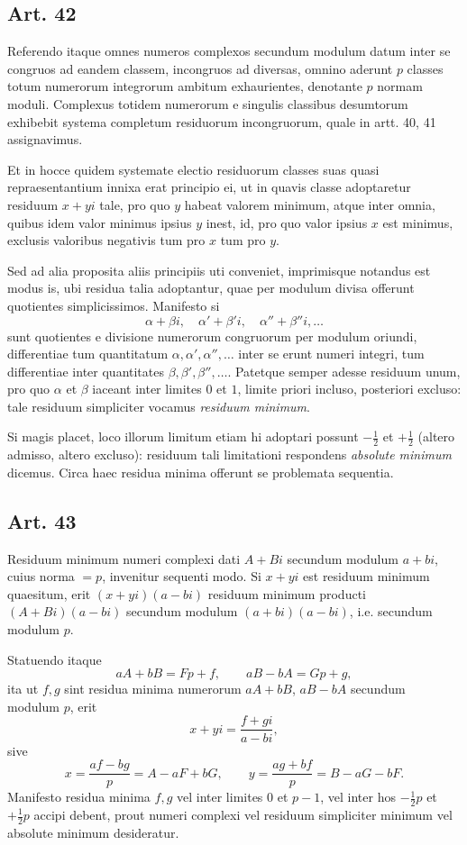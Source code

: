 \documentclass[12pt]{article}
\newcommand{\art}[1]{\subsection*{Art. #1}}
\begin{document}
\art{42}
Referendo itaque omnes numeros complexos secundum modulum datum inter se congruos ad eandem classem, incongruos ad diversas, omnino aderunt $p$ classes totum numerorum integrorum ambitum exhaurientes, denotante $p$ normam moduli. Complexus totidem numerorum e singulis classibus desumtorum exhibebit systema completum residuorum incongruorum, quale in artt. 40, 41 assignavimus.

Et in hocce quidem systemate electio residuorum classes suas quasi repraesentantium innixa erat principio ei, ut in quavis classe adoptaretur residuum $x+yi$ tale, pro quo $y$ habeat valorem minimum, atque inter omnia, quibus idem valor minimus ipsius $y$ inest, id, pro quo valor ipsius $x$ est minimus, exclusis valoribus negativis tum pro $x$ tum pro $y$.

Sed ad alia proposita aliis principiis uti conveniet, imprimisque notandus est modus is, ubi residua talia adoptantur, quae per modulum divisa offerunt quotientes simplicissimos. Manifesto si
\[
\alpha+\beta i,\quad \alpha'+\beta'i,\quad \alpha''+\beta''i,\ldots
\]
sunt quotientes e divisione numerorum congruorum per modulum oriundi, differentiae tum quantitatum $\alpha,\alpha',\alpha'',\ldots$ inter se erunt numeri integri, tum differentiae inter quantitates $\beta,\beta',\beta'',\ldots$. Patetque semper adesse residuum unum, pro quo $\alpha$ et $\beta$ iaceant inter limites $0$ et $1$, limite priori incluso, posteriori excluso: tale residuum simpliciter vocamus \emph{residuum minimum}.

Si magis placet, loco illorum limitum etiam hi adoptari possunt $-\frac12$ et $+\frac12$ (altero admisso, altero excluso): residuum tali limitationi respondens \emph{absolute minimum} dicemus. Circa haec residua minima offerunt se problemata sequentia.

\art{43}
Residuum minimum numeri complexi dati $A+Bi$ secundum modulum $a+bi$, cuius norma $=p$, invenitur sequenti modo. Si $x+yi$ est residuum minimum quaesitum, erit $(x+yi)(a-bi)$ residuum minimum producti $(A+Bi)(a-bi)$ secundum modulum $(a+bi)(a-bi)$, i.e. secundum modulum $p$.

Statuendo itaque
\[
aA+bB=Fp+f,\qquad aB-bA=Gp+g,
\]
ita ut $f,g$ sint residua minima numerorum $aA+bB$, $aB-bA$ secundum modulum $p$, erit
\[
x+yi=\frac{f+gi}{a-bi},
\]
sive
\[
 x=\frac{af-bg}{p}=A-aF+bG,\qquad
 y=\frac{ag+bf}{p}=B-aG-bF.
\]
Manifesto residua minima $f,g$ vel inter limites $0$ et $p-1$, vel inter hos $-\frac12p$ et $+\frac12p$ accipi debent, prout numeri complexi vel residuum simpliciter minimum vel absolute minimum desideratur.
\end{document}
